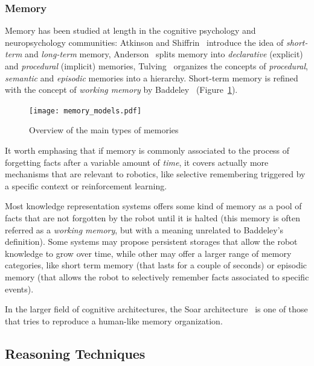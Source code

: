 \documentclass[a4paper, twocolumn]{article}
\begin{document}
\subsubsection{Memory}
\label{sect|memory}

Memory has been studied at length in the cognitive psychology and
neuropsychology communities: Atkinson and Shiffrin~\cite{Atkinson1968}
introduce the idea of \emph{short-term} and \emph{long-term} memory,
Anderson~\cite{Anderson1976} splits memory into \emph{declarative} (explicit)
and \emph{procedural} (implicit) memories, Tulving~\cite{Tulving1985} organizes
the concepts of \emph{procedural}, \emph{semantic} and \emph{episodic} memories
into a hierarchy. Short-term memory is refined with the concept of
\emph{working memory} by Baddeley~\cite{Baddeley2010}
(Figure~\ref{fig|memory_models}).

\begin{figure}
    \centering
    \texttt{[image: memory\_models.pdf]}
    \caption{Overview of the main types of memories}
    \label{fig|memory_models}
\end{figure}

It worth emphasing that if memory is commonly associated to the process of
forgetting facts after a variable amount of \emph{time}, it covers actually
more mechanisms that are relevant to robotics, like selective remembering
triggered by a specific context or reinforcement learning.

Most knowledge representation systems offers some kind of memory as a pool of
facts that are not forgotten by the robot until it is halted (this memory is
often referred as a \emph{working memory}, but with a meaning unrelated to
Baddeley's definition). Some systems may propose persistent storages that allow
the robot knowledge to grow over time, while other may offer a larger range of
memory categories, like short term memory (that lasts for a couple of seconds)
or episodic memory (that allows the robot to selectively remember facts
associated to specific events).

In the larger field of cognitive architectures, the {\sc Soar}
architecture~\cite{Lehman2006} is one of those that tries to reproduce a
human-like memory organization.

\subsection{Reasoning Techniques}
\label{sect|reasoning}
\end{document}

